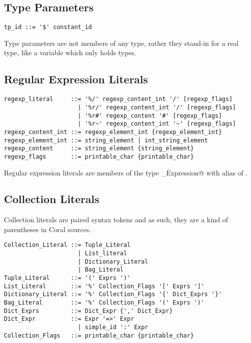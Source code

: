\subsection{Type Parameters}\label{sec:typeparameterliterals}

\syntax\begin{lstlisting}[mathescape=false]
tp_id ::= '$' constant_id
\end{lstlisting}

Type parameters are not members of any type, rather they stand-in for a real type, like a variable which only holds types. 

\subsection{Regular Expression Literals}\label{sec:regexpliterals}

\syntax\begin{lstlisting}
regexp_literal     ::= '%/' regexp_content_int '/' [regexp_flags]
	                 | '%r/' regexp_content_int '/' [regexp_flags]
	                 | '%r#' regexp_content '#' [regexp_flags]
	                 | '%r~' regexp_content_int '~' [regexp_flags]
regexp_content_int ::= regexp_element_int {regexp_element_int}
regexp_element_int ::= string_element | int_string_element
regexp_content     ::= string_element {string_element}
regexp_flags       ::= printable_char {printable_char}
\end{lstlisting}

Regular expression literals are members of the type \lstinline@Regular_Expression@ with alias of \lstinline@Regexp@. 

\subsection{Collection Literals}\label{sec:collectionliterals}

Collection literals are paired syntax tokens and as such, they are a kind of parentheses in Coral sources. 

\syntax\begin{lstlisting}
Collection_Literal ::= Tuple_Literal
	                 | List_literal
	                 | Dictionary_Literal
	                 | Bag_Literal
Tuple_Literal      ::= '(' Exprs ')'
List_Literal       ::= '%' Collection_Flags '[' Exprs ']'
Dictionary_Literal ::= '%' Collection_Flags '{' Dict_Exprs '}'
Bag_Literal        ::= '%' Collection_Flags '(' Exprs ')'
Dict_Exprs         ::= Dict_Expr {',' Dict_Expr}
Dict_Expr          ::= Expr '=>' Expr
	                 | simple_id ':' Expr
Collection_Flags   ::= printable_char {printable_char}
\end{lstlisting}

